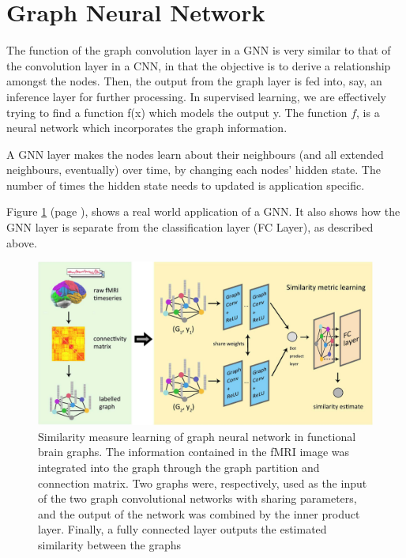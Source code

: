 \section{Graph Neural Network}
The function of the graph convolution layer in a GNN is very similar to that of the convolution layer in a CNN, in that the objective is to derive a relationship amongst the nodes. Then, the output from the graph layer is fed into, say, an inference layer for further processing. 
In supervised learning, we are effectively trying to find a function f(x) which models the output y.
The function $f$, is a neural network which incorporates the graph information.

A GNN layer makes the nodes learn about their neighbours (and all extended neighbours, eventually) over time, by changing each nodes' hidden state. The number of times the hidden state needs to updated is application specific. 

Figure \ref{fgene} (page \pageref{fgene}), shows a real world application of a GNN. It also shows how the GNN layer is separate from the classification layer (FC Layer), as described above.

\begin{figure}
     \centering
     \includegraphics[width= \textwidth]{pics/fgene.jpg}
     \caption{Similarity measure learning of graph neural network in functional brain graphs. The information contained in the fMRI image was integrated into the graph through the graph partition and connection matrix. Two graphs were, respectively, used as the input of the two graph convolutional networks with sharing parameters, and the output of the network was combined by the inner product layer. Finally, a fully connected layer outputs the estimated similarity between the graphs \cite{zhang_graph_2021}}
     \label{fgene}
\end{figure}

